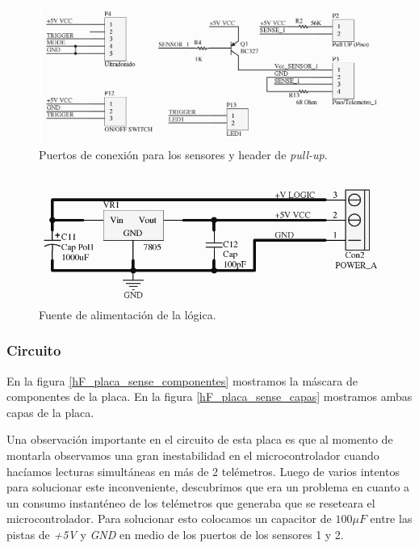 \begin{figure}
	\centering
	\includegraphics[scale=.28]{figuras/sense_schemaSensor.png}
	\caption{Puertos de conexi\'on para los sensores y header de \emph{pull-up}.}
	\label{hF_placa_sense_schema3}
\end{figure}

\begin{figure}
	\centering
	\includegraphics[scale=.22]{figuras/sense_schemaFuente.png}
	\caption{Fuente de alimentaci\'on de la l\'ogica.}
	\label{hF_placa_sense_schema4}
\end{figure}

\subsubsection{Circuito}
\label{h_placas_sensado_circuito}

En la figura \ref{hF_placa_sense_componentes} mostramos la m\'ascara de componentes de la placa.
En la figura \ref{hF_placa_sense_capas} mostramos ambas capas de la placa.

Una observaci\'on importante en el circuito de esta placa es que al momento de montarla
observamos una gran inestabilidad en el microcontrolador cuando hac\'iamos lecturas simult\'aneas
en m\'as de 2 tel\'emetros.
Luego de varios intentos para solucionar este inconveniente, descubrimos que era un problema
en cuanto a un consumo instant\'eneo de los tel\'emetros que generaba que se reseteara el
microcontrolador.
Para solucionar esto colocamos un capacitor de $100\mu F$ entre las pistas de \emph{+5V} y
\emph{GND} en medio de los puertos de los sensores 1 y 2.

